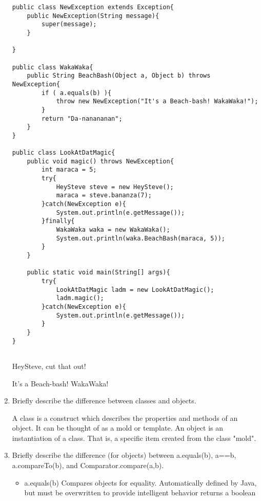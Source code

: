 \documentclass[11pt]{article}
\newenvironment{answer}{\large\lstset{basicstyle=\large}\color{white}}{}
\newenvironment{answer}{\large\lstset{basicstyle=\large}\color{red}}{}
\begin{document}
\begin{enumerate}
\begin{lstlisting}
public class NewException extends Exception{
    public NewException(String message){
        super(message);
    }

}
           
public class WakaWaka{
    public String BeachBash(Object a, Object b) throws NewException{
        if ( a.equals(b) ){
            throw new NewException("It's a Beach-bash! WakaWaka!");
        }
        return "Da-nanananan";
    }
}

public class LookAtDatMagic{
    public void magic() throws NewException{
        int maraca = 5;
        try{
            HeySteve steve = new HeySteve();
            maraca = steve.bananza(7);
        }catch(NewException e){
            System.out.println(e.getMessage());
        }finally{
            WakaWaka waka = new WakaWaka();
            System.out.println(waka.BeachBash(maraca, 5));
        }
    }

    public static void main(String[] args){
        try{
            LookAtDatMagic ladm = new LookAtDatMagic();
            ladm.magic();
        }catch(NewException e){
            System.out.println(e.getMessage());
        }
    }
}


\end{lstlisting}
\begin{answer}
HeySteve, cut that out!


It's a Beach-bash! WakaWaka!
\end{answer}

\item Briefly describe the difference between classes and objects.

\begin{answer}
    A class is a construct which describes the properties and methods of an
    object. It can be thought of as a mold or template. An object is an 
    instantiation of a class. That is, a specific item created from the class
    "mold".
\end{answer}

\item Briefly describe the difference (for objects) between a.equals(b), a==b,
a.compareTo(b), and Comparator.compare(a,b).

\begin{answer}
    \begin{itemize}

    \item a.equals(b) Compares objects for equality. Automatically defined
    by Java, but must be overwritten to provide intelligent behavior
    returns a boolean


\end{itemize}
\end{answer}
\end{enumerate}
\end{document}
